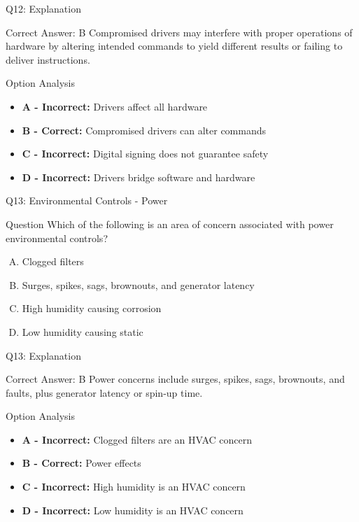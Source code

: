 \documentclass{beamer}
\begin{document}
	\begin{frame}{Q12: Explanation}
		\begin{block}{Correct Answer: B}
			Compromised drivers may interfere with proper operations of hardware by altering intended commands to yield different results or failing to deliver instructions.
		\end{block}
		\begin{block}{Option Analysis}
			\begin{itemize}
				\item \textbf{A - Incorrect:} Drivers affect all hardware
				\item \textbf{B - Correct:} Compromised drivers can alter commands
				\item \textbf{C - Incorrect:} Digital signing does not guarantee safety
				\item \textbf{D - Incorrect:} Drivers bridge software and hardware
			\end{itemize}
		\end{block}
	\end{frame}
	
	\begin{frame}{Q13: Environmental Controls - Power}
		\begin{block}{Question}
			Which of the following is an area of concern associated with power environmental controls?
		\end{block}
		\begin{enumerate}[(A)]
			\item Clogged filters
			\item Surges, spikes, sags, brownouts, and generator latency
			\item High humidity causing corrosion
			\item Low humidity causing static
		\end{enumerate}
	\end{frame}
	
	\begin{frame}{Q13: Explanation}
		\begin{block}{Correct Answer: B}
			Power concerns include surges, spikes, sags, brownouts, and faults, plus generator latency or spin-up time.
		\end{block}
		\begin{block}{Option Analysis}
			\begin{itemize}
				\item \textbf{A - Incorrect:} Clogged filters are an HVAC concern
				\item \textbf{B - Correct:} Power effects
				\item \textbf{C - Incorrect:} High humidity is an HVAC concern
				\item \textbf{D - Incorrect:} Low humidity is an HVAC concern
			\end{itemize}
		\end{block}
	\end{frame}
	
\end{document}
